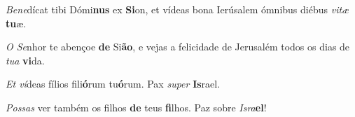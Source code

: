 \begin{greenumerate}

  \item \textit{Bene}dícat tibi Dómi\textbf{nus} ex \textbf{Si}on, {\GreStar} et vídeas bona Ierúsalem ómnibus diébus \textit{vitæ} \textbf{tu}æ. 

  \switchcolumn%

  \item \textit{O Se}nhor te abençoe \textbf{de} Si\textbf{ão}, {\GreStar} e vejas a felicidade de Jerusalém todos os dias de \textit{tua} \textbf{vi}da. 

  \switchcolumn*


  \item \textit{Et ví}deas fílios fili\textbf{ó}rum tu\textbf{ó}rum. {\GreStar} Pax \textit{super} \textbf{Is}rael. 

  \switchcolumn%

  \item \textit{Possas} ver também os filhos \textbf{de} teus \textbf{fi}lhos. {\GreStar} Paz sobre \textit{Isra}\textbf{el}! 
\end{greenumerate}